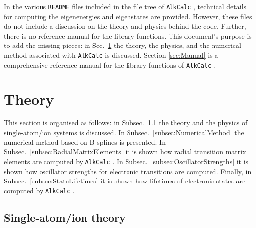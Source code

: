 \documentclass[fontsize=12pt,
               twoside=false,
               BCOR=0mm,
               DIV=14,
               overfullrule=false, %
               toc=bibliography,
               headinclude=true,
               footinclude=false]{scrartcl}
\numberwithin{equation}{section}
\newcommand{\alkcalc}{\texttt{AlkCalc} }
\begin{document}
    In the various \texttt{README} files included in the file tree of \alkcalc,
    technical details for computing the eigenenergies and eigenstates are
    provided. However, these files do not include a discussion on the theory and
    physics behind the code. Further, there is no reference manual for the
    library functions. This document's purpose is to add the missing pieces: in
    Sec.~\ref{sec:Theory} the theory, the physics, and the numerical method
    associated with \alkcalc is discussed. Section \ref{sec:Manual} is a
    comprehensive reference manual for the library functions of \alkcalc.

    \section{Theory}
    \label{sec:Theory}

    This section is organised as follows: in
    Subsec.~\ref{subsec:SingleAtomIonTheory} the theory and the physics of
    single-atom/ion systems is discussed. In
    Subsec.~\ref{subsec:NumericalMethod} the numerical method based on B-splines
    is presented. In Subsec.~\ref{subsec:RadialMatrixElements} it is shown how
    radial transition matrix elements are computed by \alkcalc. In
    Subsec.~\ref{subsec:OscillatorStrengths} it is shown how oscillator
    strengths for electronic transitions are computed. Finally, in
    Subsec.~\ref{subsec:StateLifetimes} it is shown how lifetimes of electronic
    states are computed by \alkcalc.

    \subsection{Single-atom/ion theory}
    \label{subsec:SingleAtomIonTheory}
\end{document}
